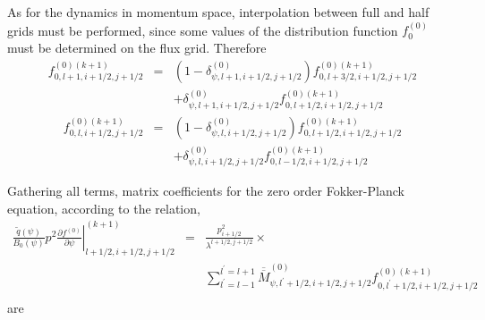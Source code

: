 As for the dynamics in momentum space, interpolation between full and half
grids must be performed, since some values of the distribution function $%
f_{0}^{\left( 0\right) }$ must be determined on the flux grid. Therefore
\begin{eqnarray}
f_{0,l+1,i+1/2,j+1/2}^{\left( 0\right) (k+1)} &=&\left( 1-\delta _{\psi
,l+1,i+1/2,j+1/2}^{\left( 0\right) }\right) f_{0,l+3/2,i+1/2,j+1/2}^{\left(
0\right) (k+1)}  \nonumber \\
&&+\delta _{\psi ,l+1,i+1/2,j+1/2}^{\left( 0\right)
}f_{0,l+1/2,i+1/2,j+1/2}^{\left( 0\right) (k+1)}
\end{eqnarray}
\begin{eqnarray}
f_{0,l,i+1/2,j+1/2}^{\left( 0\right) (k+1)} &=&\left( 1-\delta _{\psi
,l,i+1/2,j+1/2}^{\left( 0\right) }\right) f_{0,l+1/2,i+1/2,j+1/2}^{\left(
0\right) (k+1)}  \nonumber \\
&&+\delta _{\psi ,l,i+1/2,j+1/2}^{\left( 0\right)
}f_{0,l-1/2,i+1/2,j+1/2}^{\left( 0\right) (k+1)}
\end{eqnarray}

Gathering all terms, matrix coefficients for the zero order Fokker-Planck
equation, according to the relation,
\begin{eqnarray}
\left. \frac{\widetilde{q}\left( \psi \right) }{B_{0}\left( \psi \right) }%
p^{2}\frac{\partial f^{\left( 0\right) }}{\partial \psi }\right|
_{l+1/2,i+1/2,j+1/2}^{(k+1)} &=&\frac{p_{i+1/2}^{2}}{\lambda ^{l+1/2,j+1/2}}%
\times   \nonumber \\
&&\sum_{l^{\prime }=l-1}^{l^{\prime }=l+1}\overline{\overline{M}}_{\psi
,l^{\prime }+1/2,i+1/2,j+1/2}^{\left( 0\right) }f_{0,l^{\prime
}+1/2,i+1/2,j+1/2}^{\left( 0\right) (k+1)}\nonumber \\
\end{eqnarray}
are

